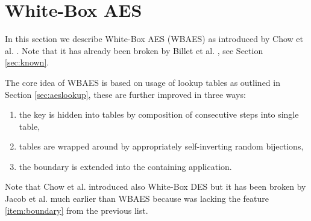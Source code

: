 \section{White-Box AES}
\label{sec:wbaes}

In this section we describe White-Box AES (WBAES) as introduced by Chow et al. \cite{chow2003white}. Note that it has already been broken by Billet et al. \cite{billet2005cryptanalysis}, see Section \ref{sec:known}.   %

The core idea of WBAES is based on usage of lookup tables as outlined in Section \ref{sec:aeslookup}, these are further improved in three ways:
\begin{enumerate}
	\item the key is hidden into tables by composition of consecutive steps into single table,
	\item tables are wrapped around by appropriately self-inverting random bijections,
	\item the boundary is extended into the containing application. \label{item:boundary}
\end{enumerate}
Note that Chow et al. introduced also White-Box DES \cite{chow2003des} but it has been broken by Jacob et al. \cite{jacob2003attacking} much earlier than WBAES because was lacking the feature \ref{item:boundary} from the previous list.



